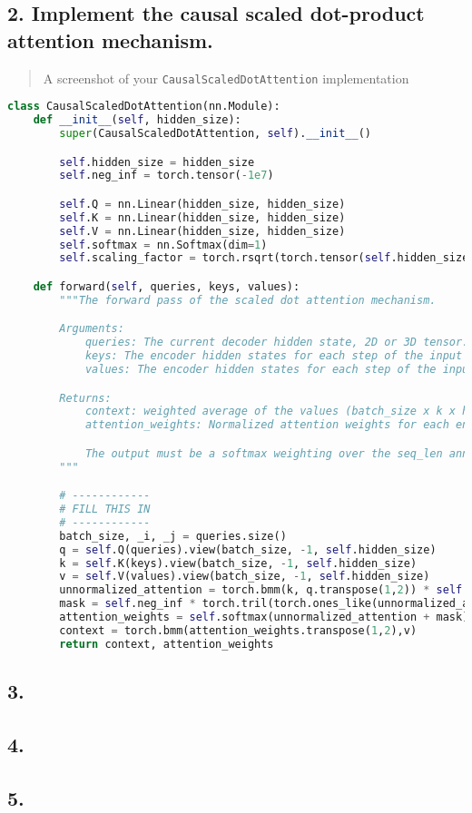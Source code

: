 \documentclass{article}
\begin{document}
\subsection*{2. Implement the causal scaled dot-product attention mechanism.}

\begin{quote}
A screenshot of your \texttt{CausalScaledDotAttention} implementation
\end{quote}

\begin{lstlisting}[language=Python]
class CausalScaledDotAttention(nn.Module):
    def __init__(self, hidden_size):
        super(CausalScaledDotAttention, self).__init__()

        self.hidden_size = hidden_size
        self.neg_inf = torch.tensor(-1e7)

        self.Q = nn.Linear(hidden_size, hidden_size)
        self.K = nn.Linear(hidden_size, hidden_size)
        self.V = nn.Linear(hidden_size, hidden_size)
        self.softmax = nn.Softmax(dim=1)
        self.scaling_factor = torch.rsqrt(torch.tensor(self.hidden_size, dtype= torch.float))

    def forward(self, queries, keys, values):
        """The forward pass of the scaled dot attention mechanism.

        Arguments:
            queries: The current decoder hidden state, 2D or 3D tensor. (batch_size x (k) x hidden_size)
            keys: The encoder hidden states for each step of the input sequence. (batch_size x seq_len x hidden_size)
            values: The encoder hidden states for each step of the input sequence. (batch_size x seq_len x hidden_size)

        Returns:
            context: weighted average of the values (batch_size x k x hidden_size)
            attention_weights: Normalized attention weights for each encoder hidden state. (batch_size x seq_len x 1)

            The output must be a softmax weighting over the seq_len annotations.
        """

        # ------------
        # FILL THIS IN
        # ------------
        batch_size, _i, _j = queries.size()
        q = self.Q(queries).view(batch_size, -1, self.hidden_size)
        k = self.K(keys).view(batch_size, -1, self.hidden_size)
        v = self.V(values).view(batch_size, -1, self.hidden_size)
        unnormalized_attention = torch.bmm(k, q.transpose(1,2)) * self.scaling_factor
        mask = self.neg_inf * torch.tril(torch.ones_like(unnormalized_attention), diagonal=-1)
        attention_weights = self.softmax(unnormalized_attention + mask)
        context = torch.bmm(attention_weights.transpose(1,2),v)
        return context, attention_weights
\end{lstlisting}

\subsection*{3. }

\subsection*{4. }

\subsection*{5. }
\end{document}

